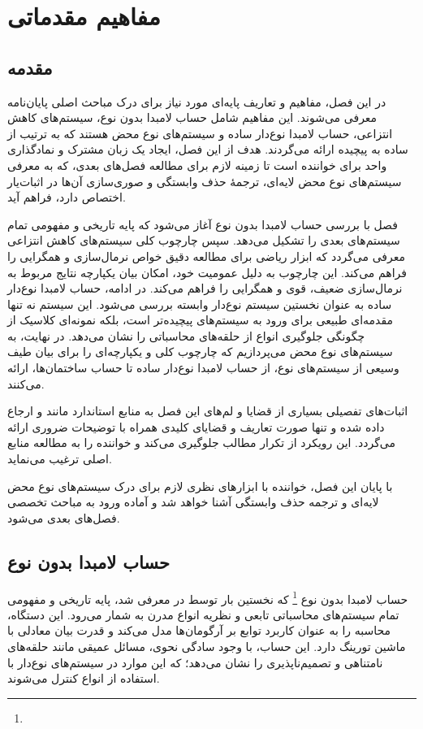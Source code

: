 \chapter{
مفاهیم مقدماتی
}\label{S1}
\setcounter{page}{1}

\section{مقدمه‌}

در این فصل، مفاهیم و تعاریف پایه‌ای مورد نیاز برای درک مباحث اصلی پایان‌نامه معرفی می‌شوند.
این مفاهیم شامل حساب لامبدا بدون نوع، سیستم‌های کاهش انتزاعی، حساب لامبدا نوع‌دار ساده و سیستم‌های نوع محض هستند که به ترتیب از ساده به پیچیده ارائه می‌گردند.
هدف از این فصل، ایجاد یک زبان مشترک و نمادگذاری واحد برای خواننده است تا زمینه لازم برای مطالعه فصل‌های بعدی، که به معرفی سیستم‌های نوع محض لایه‌ای، ترجمهٔ حذف وابستگی و صوری‌سازی آن‌ها در اثبات‌یار
اختصاص دارد، فراهم آید.

فصل با بررسی حساب لامبدا بدون نوع آغاز می‌شود که پایه تاریخی و مفهومی تمام سیستم‌های بعدی را تشکیل می‌دهد.
سپس چارچوب کلی سیستم‌های کاهش انتزاعی معرفی می‌گردد که ابزار ریاضی برای مطالعه دقیق خواص نرمال‌سازی و همگرایی را فراهم می‌کند. این چارچوب به دلیل عمومیت خود، امکان بیان یکپارچه نتایج مربوط به نرمال‌سازی ضعیف، قوی و همگرایی را فراهم می‌کند.
در ادامه، حساب لامبدا نوع‌دار ساده به عنوان نخستین سیستم نوع‌دار وابسته بررسی می‌شود. این سیستم نه تنها مقدمه‌ای طبیعی برای ورود به سیستم‌های پیچیده‌تر است، بلکه نمونه‌ای کلاسیک از چگونگی جلوگیری انواع از حلقه‌های محاسباتی را نشان می‌دهد.
در نهایت، به سیستم‌های نوع محض می‌پردازیم که چارچوب کلی و یکپارچه‌ای را برای بیان طیف وسیعی از سیستم‌های نوع، از حساب لامبدا نوع‌دار ساده تا حساب ساختمان‌ها، ارائه می‌کنند.

اثبات‌های تفصیلی بسیاری از قضایا و لم‌های این فصل به منابع استاندارد مانند
\cite{barendregt} و \cite{geuvers1993}
ارجاع داده شده و تنها صورت تعاریف و قضایای کلیدی همراه با توضیحات ضروری ارائه می‌گردد.
این رویکرد از تکرار مطالب جلوگیری می‌کند و خواننده را به مطالعه منابع اصلی ترغیب می‌نماید.

با پایان این فصل، خواننده با ابزارهای نظری لازم برای درک سیستم‌های نوع محض لایه‌ای و ترجمه حذف وابستگی آشنا خواهد شد و آماده ورود به مباحث تخصصی فصل‌های بعدی می‌شود.

\section{حساب لامبدا بدون نوع}

حساب لامبدا بدون نوع
\footnote{}
که نخستین بار توسط
در
\cite{church1932}
معرفی شد، پایه تاریخی و مفهومی تمام سیستم‌های محاسباتی تابعی و نظریه انواع مدرن به شمار می‌رود.
این دستگاه، محاسبه را به عنوان کاربرد توابع بر آرگومان‌ها مدل می‌کند و قدرت بیان معادلی با ماشین تورینگ دارد.
این حساب، با وجود سادگی نحوی، مسائل عمیقی مانند حلقه‌های نامتناهی و تصمیم‌ناپذیری را نشان می‌دهد؛ که این موارد در سیستم‌های نوع‌دار با استفاده از انواع کنترل می‌شوند.

